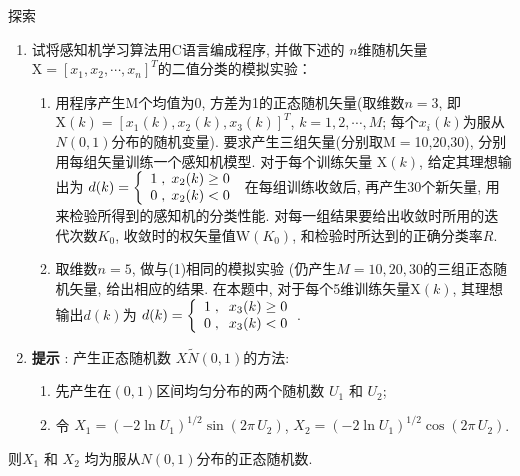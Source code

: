 \begin{custom}[explorecolor]{探索}
\begin{enumerate}
\item 试将感知机学习算法用C语言编成程序, 并做下述的 $n$维随机矢量$\mbox{X}=[x_{1} ,x_{2} ,\cdots ,x_{n} ]^{T}$的二值分类的模拟实验：
	\begin{enumerate}
	\item 用程序产生M个均值为0, 方差为1的正态随机矢量(取维数$n=3$, 即 $\mbox{X}(k)=[x_{1} (k),x_{2} (k),x_{3} (k)]^{T}$, $k=1,2,\cdots ,M$; 每个$x_{i} (k)$为服从$N(0,1)$分布的随机变量). 要求产生三组矢量(分别取M$=$10,20,30), 分别用每组矢量训练一个感知机模型. 对于每个训练矢量 $\mbox{X}(k)$, 给定其理想输出为
$d(k)=
\left\{
\begin{array}{*{20}c}
 1\;,\;x_{2}(k)\ge 0 \\
 0\;,\;x_{2}(k)<0  \\
\end{array}
\right.$
在每组训练收敛后, 再产生30个新矢量, 用来检验所得到的感知机的分类性能. 对每一组结果要给出收敛时所用的迭代次数$K_{0}$, 收敛时的权矢量值$\mbox{W}(K_{0})$, 和检验时所达到的正确分类率$R$.
	\item 取维数$n=5$, 做与(1)相同的模拟实验 (仍产生$M=10,20,30$的三组正态随机矢量, 给出相应的结果. 在本题中, 对于每个5维训练矢量$\mbox{X}(k)$, 其理想输出$d(k)$为 $d(k)=
\left\{
\begin{array}{*{20}c}
 1\;,\;\;x_{3}(k)\ge 0\\
 0\;,\;\;x_{3}(k)<0\\
\end{array} \right.$.
	\end{enumerate}
\item[\textbullet] \textbf{提示 }: 产生正态随机数 $X\tilde N(0,1)$的方法:
	\begin{enumerate}
	\item 先产生在$(0, 1)$区间均匀分布的两个随机数 $U_{1}$ 和 $U_{2}$;
	\item 令 $X_{1} =(-2\ln U_{1} )^{1/2}\sin (2\pi \,U_{2} )$, $X_{2} =(-2\ln U_{1} )^{1/2}\cos (2\pi \,U_{2})$.
	\end{enumerate}
\end{enumerate}
则$X_{1} $ 和 $X_{2} $ 均为服从$N(0,1)$分布的正态随机数.
\end{custom}
